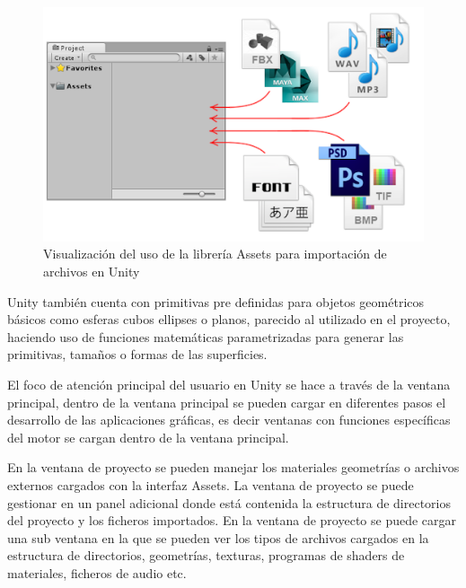\documentclass[a4paper, 17pt]{book}
\begin{document}
\begin{figure}[H]
    \centering
    \includegraphics[scale=0.60, keepaspectratio]{img/unity_assets.png}
    \caption{Visualización del uso de la librería Assets para importación de archivos en Unity}
    \label{figura:unity_assets}
\end{figure}

Unity también cuenta con primitivas pre definidas para objetos geométricos básicos como esferas cubos
ellipses o planos, parecido al utilizado en el proyecto, haciendo uso de funciones matemáticas parametrizadas
para generar las primitivas, tamaños o formas de las superficies.

\vspace{1mm} %

El foco de atención principal del usuario en Unity se hace a través de la ventana principal, dentro de
la ventana principal se pueden cargar en diferentes pasos el desarrollo de las aplicaciones gráficas,
es decir ventanas con funciones específicas del motor se cargan dentro de la ventana principal. 

\vspace{1mm} %

En la ventana de proyecto se pueden manejar los materiales geometrías o archivos externos cargados con la
interfaz Assets. La ventana de proyecto se puede gestionar en un panel adicional donde está contenida la
estructura de directorios del proyecto y los ficheros importados. En la ventana de proyecto se puede cargar
una sub ventana en la que se pueden ver los tipos de archivos cargados en la estructura de directorios,
geometrías, texturas, programas de shaders de materiales, ficheros de audio etc.

\vspace{1mm} %
\end{document}
